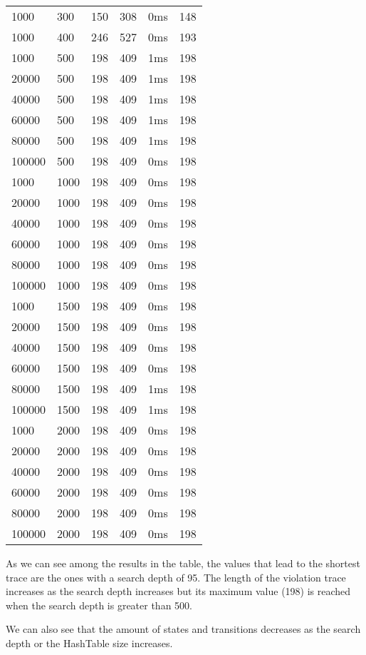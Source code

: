 \begin{longtable}{l|l|l|l|l|l}
1000 & 300 & 150 & 308 & 0ms & 148 \\
1000 & 400 & 246 & 527 & 0ms & 193 \\
1000 & 500 & 198 & 409 & 1ms & 198 \\
20000 & 500 & 198 & 409 & 1ms & 198 \\
40000 & 500 & 198 & 409 & 1ms & 198 \\
60000 & 500 & 198 & 409 & 1ms & 198 \\
80000 & 500 & 198 & 409 & 1ms & 198 \\
100000 & 500 & 198 & 409 & 0ms & 198 \\
1000 & 1000 & 198 & 409 & 0ms & 198 \\
20000 & 1000 & 198 & 409 & 0ms & 198 \\
40000 & 1000 & 198 & 409 & 0ms & 198 \\
60000 & 1000 & 198 & 409 & 0ms & 198 \\
80000 & 1000 & 198 & 409 & 0ms & 198 \\
100000 & 1000 & 198 & 409 & 0ms & 198 \\
1000 & 1500 & 198 & 409 & 0ms & 198 \\
20000 & 1500 & 198 & 409 & 0ms & 198 \\
40000 & 1500 & 198 & 409 & 0ms & 198 \\
60000 & 1500 & 198 & 409 & 0ms & 198 \\
80000 & 1500 & 198 & 409 & 1ms & 198 \\
100000 & 1500 & 198 & 409 & 1ms & 198 \\
1000 & 2000 & 198 & 409 & 0ms & 198 \\
20000 & 2000 & 198 & 409 & 0ms & 198 \\
40000 & 2000 & 198 & 409 & 0ms & 198 \\
60000 & 2000 & 198 & 409 & 0ms & 198 \\
80000 & 2000 & 198 & 409 & 0ms & 198 \\
100000 & 2000 & 198 & 409 & 0ms & 198 \\
\end{longtable}

As we can see among the results in the table, the values that lead to the shortest trace are the ones with a search depth of 95. The length of the violation trace increases as the search depth increases but its maximum value (198) is reached when the search depth is greater than 500. \newline

We can also see that the amount of states and transitions decreases as the search depth or the HashTable size increases. \newline
